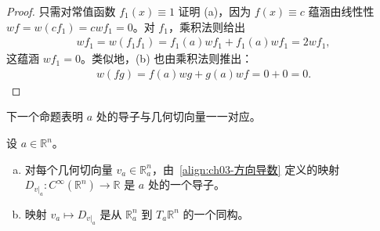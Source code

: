 \documentclass[../../main.tex]{subfiles}
\begin{document}
\begin{proof}
只需对常值函数 $f_{1}(x)\equiv 1$ 证明 (a)，因为 $f(x)\equiv c$ 蕴涵由线性性 $wf=w(cf_{1})=cwf_{1}=0$。对 $f_{1}$，乘积法则给出
\begin{align*}
wf_{1}=w(f_{1}f_{1})=f_{1}(a)wf_{1}+f_{1}(a)wf_{1}=2wf_{1},
\end{align*}
这蕴涵 $wf_{1}=0$。类似地，(b) 也由乘积法则推出：
\begin{align*}
w(fg)=f(a)wg+g(a)wf=0+0=0.
\end{align*}
\end{proof}

下一个命题表明 $a$ 处的导子与几何切向量一一对应。

\begin{proposition}\label{proposition:ch03-导子与几何切向量}
设 $a\in\mathbb{R}^{n}$。
\begin{enumerate}[(a)]
\item 对每个几何切向量 $v_{a}\in\mathbb{R}^{n}_{a}$，由~\eqref{align:ch03-方向导数} 定义的映射 $D_{v|_{a}}:C^{\infty}(\mathbb{R}^{n})\to\mathbb{R}$ 是 $a$ 处的一个导子。
\item 映射 $v_{a}\mapsto D_{v|_{a}}$ 是从 $\mathbb{R}^{n}_{a}$ 到 $T_{a}\mathbb{R}^{n}$ 的一个同构。
\end{enumerate}
\end{proposition}
\end{document}
